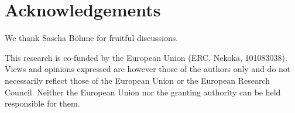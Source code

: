 \documentclass[]{ceurart}
\begin{document}
\section*{Acknowledgements}

We thank Sascha Böhme for fruitful discussions.

This research is co-funded by the European Union (ERC, Nekoka, 101083038).
Views and opinions expressed are however those of the authors only and do not
necessarily reflect those of the European Union or the European Research
Council. Neither the European Union nor the granting authority can be held
responsible for them.


\end{document}
